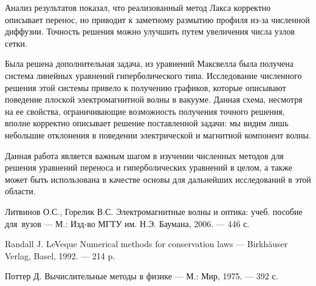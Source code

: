\documentclass[12pt,a4paper]{article}
\begin{document}
	Анализ результатов показал, что реализованный метод Лакса корректно описывает перенос, но приводит к заметному размытию профиля из-за численной диффузии. Точность решения можно улучшить путем увеличения числа узлов сетки.
	
	Была решена дополнительная задача, из уравнений Максвелла была получена система линейных уравнений гиперболического типа. Исследование численного решения этой системы привело к получению графиков, которые описывают поведение плоской электромагнитной волны в вакууме. Данная схема, несмотря на ее свойства, ограничивающие возможность получения точного решения, вполне корректно описывает решение поставленной задачи: мы видим лишь небольшие отклонения в поведении электрической и магнитной компонент волны.
	
	Данная работа является важным шагом в изучении численных методов для решения уравнений переноса и гиперболических уравнений в целом, а также может быть использована в качестве основы для дальнейших исследований в этой области.
	
	\begin{thebibliography}{4}
		 Литвинов О.С., Горелик В.С. Электромагнитные волны и оптика: учеб. пособие для~вузов --- М.: Изд-во МГТУ им. Н.Э. Баумана, 2006. --- 446 с.
		
		 Randall J. LeVeque Numerical methods for conservation laws --- Birkhäuser Verlag, Basel, 1992. --- 214 p.
		
		 Поттер Д. Вычислительные методы в физике --- М.: Мир, 1975. --- 392 с.
		
		
	\end{thebibliography}
	
\end{document}
